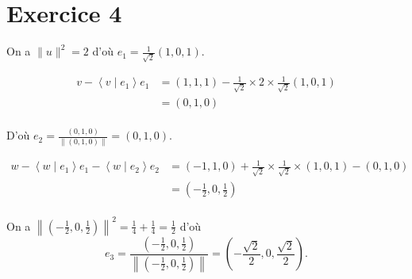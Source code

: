 \part{Exercice 4}

On a $\|u\|^2 = 2$ d'où $e_1 = \frac{1}{\sqrt{2}}(1, 0, 1)$.

\begin{align*}
	v  - \left<v \mid e_1 \right>e_1 &= (1,1,1) - \frac{1}{\sqrt{2}} \times 2 \times \frac{1}{\sqrt{2}}(1,0,1) \\
	&= (0, 1, 0) \\
\end{align*}

D'où $e_2 = \frac{(0,1,0)}{\|(0,1,0)\|} = (0, 1, 0)$.

\begin{align*}
	w - \left<w \mid e_1 \right> e_1 - \left<w  \mid e_2 \right> e_2
	&= (-1, 1, 0) + \frac{1}{\sqrt{2}}\times \frac{1}{\sqrt{2}} \times (1, 0, 1) - (0,1,0) \\
	&= \left( -\frac{1}{2}, 0, \frac{1}{2} \right) \\
\end{align*}

On a $\left\|\left( -\frac{1}{2}, 0, \frac{1}{2} \right) \right\|^2 = \frac{1}{4} + \frac{1}{4} = \frac{1}{2}$ d'où \[
	e_3 = \frac{\left( -\frac{1}{2}, 0, \frac{1}{2} \right)}{\left\|\left( -\frac{1}{2}, 0, \frac{1}{2} \right)\right\|} = \left( -\frac{\sqrt{2}}{2}, 0, \frac{\sqrt{2}}{2} \right)
.\]


